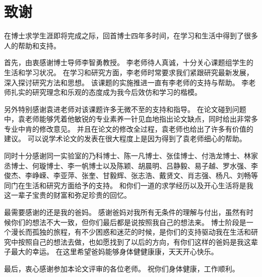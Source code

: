 \chapter*{致\quad 谢}

\quad\quad 在博士求学生涯即将完成之际，回首博士四年多时间，在学习和生活中得到了很多人的帮助和支持。

\quad\quad  首先，由衷感谢博士导师李智勇教授。
李老师待人真诚，十分关心课题组学生的生活和学习状况。
在学习和研究方面，李老师时常要求我们紧跟研究最新发展，深入探讨研究方法和思想。
该课题的实施推进一直有李老师的支持与帮助。
李老师扎实的研究理念和乐观的态度成为我今后效仿和学习的楷模。

\quad\quad  另外特别感谢袁进老师对该课题许多无微不至的支持和指导。
在论文碰到问题中，袁老师能够凭着他敏锐的专业素养一针见血地指出论文缺点，同时给出非常多专业中肯的修改意见。
并且在论文的修改全过程，袁老师也给出了许多有价值的建议。
可以说学术论文的发表在很大程度上是因为得到了袁老师细心的帮助。

\quad\quad 同时十分感谢同一实验室的乃科博士、陈一凡博士、张佳博士、付浩龙博士、林家丞博士、何璇博士、李一帆博士以及陈颖、胡晨明、吕静毅、易子越、罗水强、李俊杰、李峥嵘、李亚萍、张奎、甘毅辉、张志浩、戴贤文、肖志强、杨凡、刘畅等同门在生活和研究方面给予的支持。
和你们一道的求学经历以及开心生活将是我这一辈子宝贵的财富和弥足珍贵的回忆。


\quad\quad 最需要感谢的还是我的爸妈。
感谢爸妈对我所有无条件的理解与付出，虽然有时候你们的想法不大一致，但你们最后都是说按照我自己的想法来。
博士阶段是一个漫长而孤独的旅程，有不少困惑和迷茫的时候，是你们的支持驱动我在生活和研究中按照自己的想法去做，也如愿找到了以后的方向，有你们这样的爸妈是我这辈子最大的幸运。
在这里希望爸妈能够身体健健康康，天天开心快乐。

\quad\quad 最后，衷心感谢参加本论文评审的各位老师。
祝你们身体健康，工作顺利。







